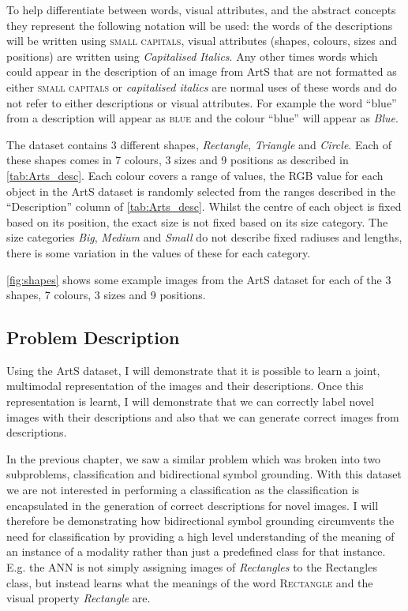 To help differentiate between words, visual attributes, and the abstract concepts they represent the following notation will be used: the words of the descriptions will be written using \textsc{small capitals}, visual attributes (shapes, colours, sizes and positions) are written using \textit{Capitalised Italics}. Any other times words which could appear in the description of an image from ArtS that are not formatted as either \textsc{small capitals} or \textit{capitalised italics} are normal uses of these words and do not refer to either descriptions or visual attributes.
For example the word ``blue'' from a description will appear as \textsc{blue} and the colour ``blue'' will appear as \textit{Blue}. 


The dataset contains 3 different shapes, \textit{Rectangle}, \textit{Triangle} and \textit{Circle}. Each of these shapes comes in 7 colours, 3 sizes and 9 positions as described in \autoref{tab:Arts_desc}. Each colour covers a range of values, the \ac{RGB} value for each object in the ArtS dataset is randomly selected from the ranges described in the ``Description'' column of \autoref{tab:Arts_desc}. Whilst the centre of each object is fixed based on its position, the exact size is not fixed based on its size category. The size categories \textit{Big}, \textit{Medium} and \textit{Small} do not describe fixed radiuses and lengths, there is some variation in the values of these for each category.


\autoref{fig:shapes} shows some example images from the ArtS dataset for each of the 3 shapes, 7 colours, 3 sizes and 9 positions.

\subsection{Problem Description}
Using the ArtS dataset, I will demonstrate that it is possible to learn a joint, multimodal representation of the images and their descriptions. Once this representation is learnt, I will demonstrate that we can correctly label novel images with their descriptions and also that we can generate correct images from descriptions.

In the previous chapter, we saw a similar problem which was broken into two subproblems, classification and bidirectional symbol grounding. With this dataset we are not interested in performing a classification as the classification is encapsulated in the generation of correct descriptions for novel images. I will therefore be demonstrating how bidirectional symbol grounding circumvents the need for classification by providing a high level understanding of the meaning of an instance of a modality rather than just a predefined class for that instance. E.g. the \ac{ANN} is not simply assigning images of \textit{Rectangles} to the Rectangles class, but instead learns what the meanings of the word \textsc{Rectangle} and the visual property \textit{Rectangle} are. 

